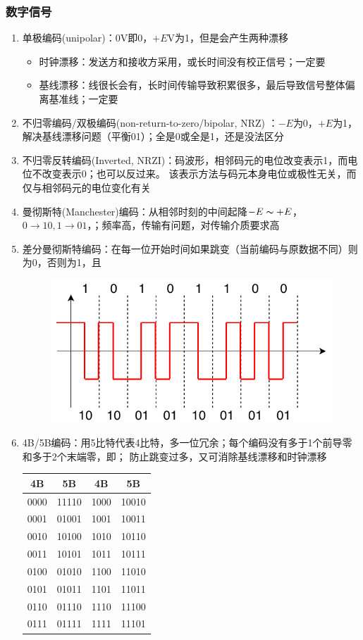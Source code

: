 \subsubsection{数字信号}
\begin{enumerate}
\item 单极编码(unipolar)：0V即0，$+E$V为1，但是会产生两种漂移
\begin{itemize}
	\item 时钟漂移：发送方和接收方采用，或长时间没有校正信号；一定要
	\item 基线漂移：线很长会有，长时间传输导致积累很多，最后导致信号整体偏离基准线；一定要
\end{itemize}
\item 不归零编码/双极编码(non-return-to-zero/bipolar, NRZ) ：$-E$为0，$+E$为1，解决基线漂移问题（平衡01）；全是0或全是1，还是没法区分
\item 不归零反转编码(Inverted, NRZI)：码波形，相邻码元的电位改变表示1，而电位不改变表示0；也可以反过来。 该表示方法与码元本身电位或极性无关，而仅与相邻码元的电位变化有关
\item 曼彻斯特(Manchester)编码：从相邻时刻的中间起降$-E\thicksim +E$，$0\to 10, 1\to 01$，；频率高，传输有问题，对传输介质要求高
\item 差分曼彻斯特编码：在每一位开始时间如果跳变（当前编码与原数据不同）则为0，否则为1，且
\begin{figure}[H]
	\centering
	\includegraphics[width=0.5\linewidth]{fig/network-manchester.pdf}
\end{figure}
\item 4B/5B编码：用5比特代表4比特，多一位冗余；每个编码没有多于1个前导零和多于2个末端零，即；
防止跳变过多，又可消除基线漂移和时钟漂移
\begin{center}
\begin{tabular}{|c|c||c|c|}\hline
4B & 5B & 4B & 5B\\\hline\hline
0000 & 11110 & 1000 & 10010\\\hline
0001 & 01001 & 1001 & 10011\\\hline
0010 & 10100 & 1010 & 10110\\\hline
0011 & 10101 & 1011 & 10111\\\hline
0100 & 01010 & 1100 & 11010\\\hline
0101 & 01011 & 1101 & 11011\\\hline
0110 & 01110 & 1110 & 11100\\\hline
0111 & 01111 & 1111 & 11101\\\hline
\end{tabular}
\end{center}
\end{enumerate}

